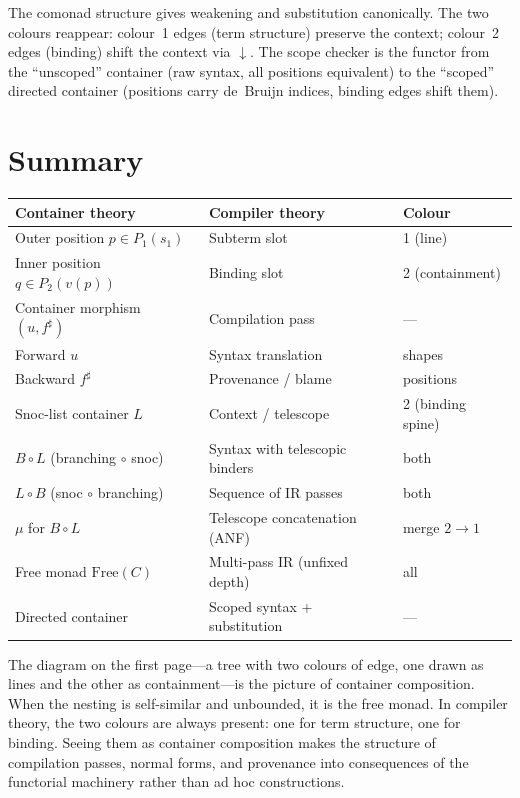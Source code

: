 \documentclass[11pt,a4paper]{article}
\theoremstyle{definition}
\theoremstyle{plain}
\newcommand{\Free}{\mathrm{Free}}
\begin{document}
The comonad structure gives weakening and substitution canonically.
The two colours reappear: colour~1 edges (term structure) preserve the
context; colour~2 edges (binding) shift the context via $\downarrow$.
The scope checker is the functor from the ``unscoped'' container (raw
syntax, all positions equivalent) to the ``scoped'' directed container
(positions carry de~Bruijn indices, binding edges shift them).

\section{Summary}

\begin{center}
\renewcommand{\arraystretch}{1.3}
\begin{tabular}{@{}lll@{}}
\hline
\textbf{Container theory} & \textbf{Compiler theory} & \textbf{Colour} \\
\hline
Outer position $p \in P_1(s_1)$ & Subterm slot & 1 (line) \\
Inner position $q \in P_2(v(p))$ & Binding slot & 2 (containment) \\
Container morphism $(u, f^\sharp)$ & Compilation pass & --- \\
\quad Forward $u$ & Syntax translation & shapes \\
\quad Backward $f^\sharp$ & Provenance / blame & positions \\
Snoc-list container $L$ & Context / telescope & 2 (binding spine) \\
$B \circ L$ (branching $\circ$ snoc) & Syntax with telescopic binders & both \\
$L \circ B$ (snoc $\circ$ branching) & Sequence of IR passes & both \\
$\mu$ for $B \circ L$ & Telescope concatenation (ANF) & merge $2 \to 1$ \\
Free monad $\Free(C)$ & Multi-pass IR (unfixed depth) & all \\
Directed container & Scoped syntax + substitution & --- \\
\hline
\end{tabular}
\end{center}

The diagram on the first page---a tree with two colours of edge, one
drawn as lines and the other as containment---is the picture of container
composition. When the nesting is self-similar and unbounded, it is the
free monad. In compiler theory, the two colours are always present: one
for term structure, one for binding. Seeing them as container composition
makes the structure of compilation passes, normal forms, and provenance
into consequences of the functorial machinery rather than ad hoc
constructions.
\end{document}
